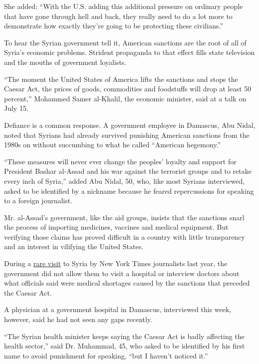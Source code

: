 She added: ``With the U.S. adding this additional pressure on ordinary
people that have gone through hell and back, they really need to do a
lot more to demonstrate how exactly they're going to be protecting these
civilians.''

To hear the Syrian government tell it, American sanctions are the root
of all of Syria's economic problems. Strident propaganda to that effect
fills state television and the mouths of government loyalists.

``The moment the United States of America lifts the sanctions and stops
the Caesar Act, the prices of goods, commodities and foodstuffs will
drop at least 50 percent,'' Mohammed Samer al-Khalil, the economic
minister, said at a talk on July 15.

Defiance is a common response. A government employee in Damascus, Abu
Nidal, noted that Syrians had already survived punishing American
sanctions from the 1980s on without succumbing to what he called
``American hegemony.''

``These measures will never ever change the peoples' loyalty and support
for President Bashar al-Assad and his war against the terrorist groups
and to retake every inch of Syria,'' added Abu Nidal, 50, who, like most
Syrians interviewed, asked to be identified by a nickname because he
feared repercussions for speaking to a foreign journalist.

Mr. al-Assad's government, like the aid groups, insists that the
sanctions snarl the process of importing medicines, vaccines and medical
equipment. But verifying those claims has proved difficult in a country
with little transparency and an interest in vilifying the United States.

During a
\href{https://www.nytimes3xbfgragh.onion/2019/08/20/world/middleeast/syria-recovery-aleppo-douma.html}{rare
visit} to Syria by New York Times journalists last year, the government
did not allow them to visit a hospital or interview doctors about what
officials said were medical shortages caused by the sanctions that
preceded the Caesar Act.

A physician at a government hospital in Damascus, interviewed this week,
however, said he had not seen any gaps recently.

``The Syrian health minister keeps saying the Caesar Act is badly
affecting the health sector,'' said Dr. Muhammad, 45, who asked to be
identified by his first name to avoid punishment for speaking, ``but I
haven't noticed it.''

